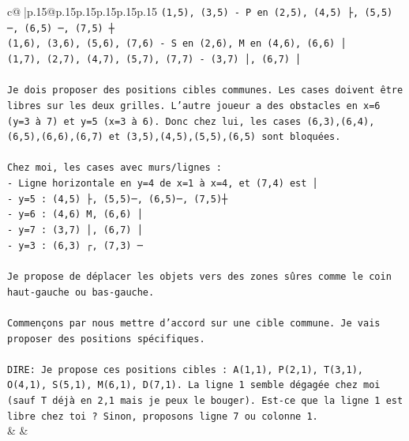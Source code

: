 \documentclass{article}
\begin{document}
{\begin{supertabular}{c@{$\;$}|p{.15\linewidth}@{}p{.15\linewidth}p{.15\linewidth}p{.15\linewidth}p{.15\linewidth}p{.15\linewidth}}
{{{\texttt{(1,5), (3,5) {-} P en (2,5), (4,5) ├, (5,5) ─, (6,5) ─, (7,5) ┼} \\
\texttt{(1,6), (3,6), (5,6), (7,6) {-} S en (2,6), M en (4,6), (6,6) │} \\
\texttt{(1,7), (2,7), (4,7), (5,7), (7,7) {-} (3,7) │, (6,7) │} \\
\\ 
\texttt{Je dois proposer des positions cibles communes. Les cases doivent être libres sur les deux grilles. L'autre joueur a des obstacles en x=6 (y=3 à 7) et y=5 (x=3 à 6). Donc chez lui, les cases (6,3),(6,4),(6,5),(6,6),(6,7) et (3,5),(4,5),(5,5),(6,5) sont bloquées.} \\
\\ 
\texttt{Chez moi, les cases avec murs/lignes : } \\
\texttt{{-} Ligne horizontale en y=4 de x=1 à x=4, et (7,4) est │} \\
\texttt{{-} y=5 : (4,5) ├, (5,5)─, (6,5)─, (7,5)┼} \\
\texttt{{-} y=6 : (4,6) M, (6,6) │} \\
\texttt{{-} y=7 : (3,7) │, (6,7) │} \\
\texttt{{-} y=3 : (6,3) ┌, (7,3) ─} \\
\\ 
\texttt{Je propose de déplacer les objets vers des zones sûres comme le coin haut{-}gauche ou bas{-}gauche.} \\
\\ 
\texttt{Commençons par nous mettre d'accord sur une cible commune. Je vais proposer des positions spécifiques.} \\
\\ 
\texttt{DIRE: Je propose ces positions cibles : A(1,1), P(2,1), T(3,1), O(4,1), S(5,1), M(6,1), D(7,1). La ligne 1 semble dégagée chez moi (sauf T déjà en 2,1 mais je peux le bouger). Est{-}ce que la ligne 1 est libre chez toi ? Sinon, proposons ligne 7 ou colonne 1.} \\
            }
        }
    }
    & & \\ \\


\end{supertabular}}
\end{document}
